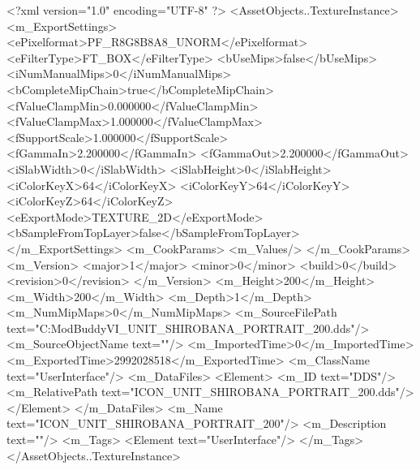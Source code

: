 <?xml version="1.0" encoding="UTF-8" ?>
<AssetObjects..TextureInstance>
	<m_ExportSettings>
		<ePixelformat>PF_R8G8B8A8_UNORM</ePixelformat>
		<eFilterType>FT_BOX</eFilterType>
		<bUseMips>false</bUseMips>
		<iNumManualMips>0</iNumManualMips>
		<bCompleteMipChain>true</bCompleteMipChain>
		<fValueClampMin>0.000000</fValueClampMin>
		<fValueClampMax>1.000000</fValueClampMax>
		<fSupportScale>1.000000</fSupportScale>
		<fGammaIn>2.200000</fGammaIn>
		<fGammaOut>2.200000</fGammaOut>
		<iSlabWidth>0</iSlabWidth>
		<iSlabHeight>0</iSlabHeight>
		<iColorKeyX>64</iColorKeyX>
		<iColorKeyY>64</iColorKeyY>
		<iColorKeyZ>64</iColorKeyZ>
		<eExportMode>TEXTURE_2D</eExportMode>
		<bSampleFromTopLayer>false</bSampleFromTopLayer>
	</m_ExportSettings>
	<m_CookParams>
		<m_Values/>
	</m_CookParams>
	<m_Version>
		<major>1</major>
		<minor>0</minor>
		<build>0</build>
		<revision>0</revision>
	</m_Version>
	<m_Height>200</m_Height>
	<m_Width>200</m_Width>
	<m_Depth>1</m_Depth>
	<m_NumMipMaps>0</m_NumMipMaps>
	<m_SourceFilePath text="C:\Users\asus\Documents\Firaxis ModBuddy\Civilization VI\temppic\ICON_UNIT_SHIROBANA_PORTRAIT_200.dds"/>
	<m_SourceObjectName text=""/>
	<m_ImportedTime>0</m_ImportedTime>
	<m_ExportedTime>2992028518</m_ExportedTime>
	<m_ClassName text="UserInterface"/>
	<m_DataFiles>
		<Element>
			<m_ID text="DDS"/>
			<m_RelativePath text="ICON_UNIT_SHIROBANA_PORTRAIT_200.dds"/>
		</Element>
	</m_DataFiles>
	<m_Name text="ICON_UNIT_SHIROBANA_PORTRAIT_200"/>
	<m_Description text=""/>
	<m_Tags>
		<Element text="UserInterface"/>
	</m_Tags>
</AssetObjects..TextureInstance>

